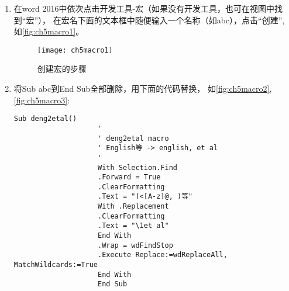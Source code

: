 \documentclass[cn,11pt,chinese]{elegantbook}
\begin{document}
			\begin{enumerate}
				\item 在word 2016中依次点击开发工具-宏（如果没有开发工具，也可在视图中找到“宏”），
				在宏名下面的文本框中随便输入一个名称（如abc），点击“创建”,
				如\autoref{fig:ch5macro1}。
					\begin{figure}[htbp]
						\centering
						\texttt{[image: ch5macro1]}
						\caption{创建宏的步骤}
						\label{fig:ch5macro1}
					\end{figure}
				\item 将Sub abc到End Sub全部删除，用下面的代码替换，
				如\autoref{fig:ch5macro2},\autoref{fig:ch5macro3}:
				\begin{lstlisting}[language=VBScript]
					Sub deng2etal()
					'
					' deng2etal macro
					' English等 -> english, et al
					'
					With Selection.Find
					.Forward = True
					.ClearFormatting
					.Text = "(<[A-z]@, )等"
					With .Replacement
					.ClearFormatting
					.Text = "\1et al"
					End With
					.Wrap = wdFindStop
					.Execute Replace:=wdReplaceAll, MatchWildcards:=True
					End With
					End Sub
			\end{lstlisting}
			

\end{enumerate}
\end{document}
